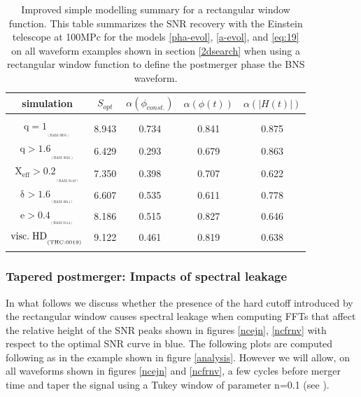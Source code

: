\begin{table}[!htbp]
\begin{center}

\begin{tabular}{ccccc}

simulation&$S_{opt}$&$\alpha(\phi_{const.})$&$\alpha(\phi(t))$&$\alpha(|H(t)|)$\\ 
\hline\\ 
$\mathrm{{q=1}_{_{_{(BAM:0035)}}}}$&8.943&0.734&0.841&0.875\\  
$\mathrm{{q>1.6}_{_{_{(BAM:0021)}}}}$&6.429&0.293&0.679&0.863\\  
$\mathrm{{X_{eff}>0.2}_{_{_{(BAM:0110)}}}}$&7.350&0.398&0.707&0.622\\  
$\mathrm{{\delta>1.6}_{_{_{(BAM:0011)}}}}$&6.607&0.535&0.611&0.778\\  
$\mathrm{{e>0.4}_{_{_{(BAM:0114)}}}}$&8.186&0.515&0.827&0.646\\  
$\mathrm{{visc.\hspace{1mm} HD}_{_{_{(THC:0019)}}}}$&9.122&0.461&0.819&0.638\\  
\hline\\ 
\end{tabular}
\captionsetup{width=0.8\textwidth}
\caption[Improved simple modelling summary for a rectangular window function]{Improved simple modelling summary for a rectangular window function. This table summarizes the SNR recovery with the Einstein telescope at 100MPc for the models \ref{pha-evol}, \ref{a-evol}, and \ref{eq:19} on all waveform examples shown in section \ref{2dsearch} when using a rectangular window function to define the postmerger phase the BNS waveform.}
\label{table untapered}
\end{center}
\end{table}
\FloatBarrier





\subsubsection*{Tapered postmerger: Impacts of spectral leakage}

In what follows we discuss whether the presence of the hard cutoff introduced by the rectangular window causes spectral leakage when computing FFTs that affect the relative height of the SNR peaks shown in figures \ref{ncejn}, \ref{ncfrnv} with respect to the optimal SNR curve in blue. The following plots are computed following as in the example shown in figure \ref{analysis}. However we will allow, on all waveforms shown in figures \ref{ncejn} and \ref{ncfrnv}, a few cycles before merger time and taper the signal using a Tukey window of parameter n=0.1 (see \cite{bloomfield1976fourier}).


